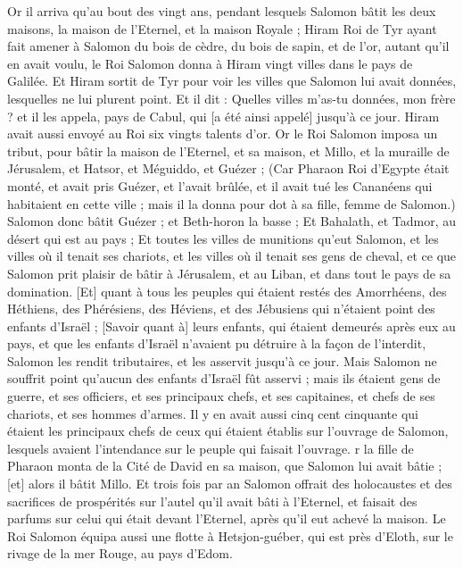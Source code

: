 \begin{multicols}{2}
Or il arriva qu'au bout des vingt ans, pendant lesquels Salomon bâtit les deux maisons, la maison de l'Eternel, et la maison Royale ;
Hiram Roi de Tyr ayant fait amener à Salomon du bois de cèdre, du bois de sapin, et de l'or, autant qu'il en avait voulu, le Roi Salomon donna à Hiram vingt villes dans le pays de Galilée.
Et Hiram sortit de Tyr pour voir les villes que Salomon lui avait données, lesquelles ne lui plurent point.
Et il dit : Quelles villes m'as-tu données, mon frère ? et il les appela, pays de Cabul, qui [a été ainsi appelé] jusqu'à ce jour.
Hiram avait aussi envoyé au Roi six vingts talents d'or.
Or le Roi Salomon imposa un tribut, pour bâtir la maison de l'Eternel, et sa maison, et Millo, et la muraille de Jérusalem, et Hatsor, et Méguiddo, et Guézer ;
(Car Pharaon Roi d'Egypte était monté, et avait pris Guézer, et l'avait brûlée, et il avait tué les Cananéens qui habitaient en cette ville ; mais il la donna pour dot à sa fille, femme de Salomon.)
Salomon donc bâtit Guézer ; et Beth-horon la basse ;
Et Bahalath, et Tadmor, au désert qui est au pays ;
Et toutes les villes de munitions qu'eut Salomon, et les villes où il tenait ses chariots, et les villes où il tenait ses gens de cheval, et ce que Salomon prit plaisir de bâtir à Jérusalem, et au Liban, et dans tout le pays de sa domination.
[Et] quant à tous les peuples qui étaient restés des Amorrhéens, des Héthiens, des Phérésiens, des Héviens, et des Jébusiens qui n'étaient point des enfants d'Israël ;
[Savoir quant à] leurs enfants, qui étaient demeurés après eux au pays, et que les enfants d'Israël n'avaient pu détruire à la façon de l'interdit, Salomon les rendit tributaires, et les asservit jusqu'à ce jour.
Mais Salomon ne souffrit point qu'aucun des enfants d'Israël fût asservi ; mais ils étaient gens de guerre, et ses officiers, et ses principaux chefs, et ses capitaines, et chefs de ses chariots, et ses hommes d'armes.
Il y en avait aussi cinq cent cinquante qui étaient les principaux chefs de ceux qui étaient établis sur l'ouvrage de Salomon, lesquels avaient l'intendance sur le peuple qui faisait l'ouvrage.
r la fille de Pharaon monta de la Cité de David en sa maison, que Salomon lui avait bâtie ; [et] alors il bâtit Millo.
Et trois fois par an Salomon offrait des holocaustes et des sacrifices de prospérités sur l'autel qu'il avait bâti à l'Eternel, et faisait des parfums sur celui qui était devant l'Eternel, après qu'il eut achevé la maison.
Le Roi Salomon équipa aussi une flotte à Hetsjon-guéber, qui est près d'Eloth, sur le rivage de la mer Rouge, au pays d'Edom.

\end{multicols}
